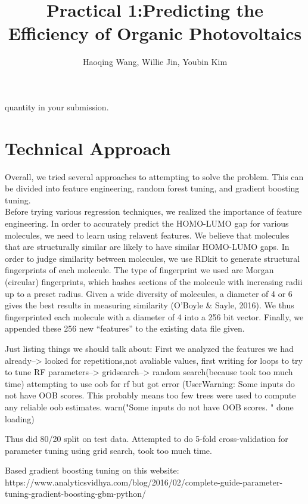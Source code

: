 \documentclass[11pt]{article}
\title{Practical 1:Predicting the Efficiency of Organic Photovoltaics}
\author{Haoqing Wang, Willie Jin, Youbin Kim }
\begin{document}
\maketitle{}



quantity in your submission.

\section{Technical Approach}

Overall, we tried several approaches to attempting to solve the problem. This can be divided into feature engineering, random forest tuning, and gradient boosting tuning. \\

Before trying various regression techniques, we realized the importance of feature engineering. In order to accurately predict the HOMO-LUMO gap for various molecules, we need to learn using relavent features. We believe that molecules that are structurally similar are likely to have similar HOMO-LUMO gaps. In order to judge similarity between molecules, we use RDkit to generate structural fingerprints of each molecule. The type of fingerprint we used are Morgan (circular) fingerprints, which hashes sections of the molecule with increasing radii up to a preset radius. Given a wide diversity of molecules, a diameter of 4 or 6 gives the best results in measuring similarity (O'Boyle \& Sayle, 2016). We thus fingerprinted each molecule with a diameter of 4 into a 256 bit vector. Finally, we appended these 256 new ``features'' to the existing data file given.

Just listing things we should talk about: First we analyzed the features we had already--> looked for repetitions,not avaliable values, first writing for loops to try to tune RF parameters--> gridsearch--> random search(because took too much time)
attempting to use oob for rf but got error (UserWarning: Some inputs do not have OOB scores. This probably means too few trees were used to compute any reliable oob estimates.
warn("Some inputs do not have OOB scores. "
done loading)

Thus did 80/20 split on test data.
Attempted to do 5-fold cross-validation for parameter tuning using grid search, took too much time. 

Based gradient boosting tuning on this website:
https://www.analyticsvidhya.com/blog/2016/02/complete-guide-parameter-tuning-gradient-boosting-gbm-python/
\end{document}
